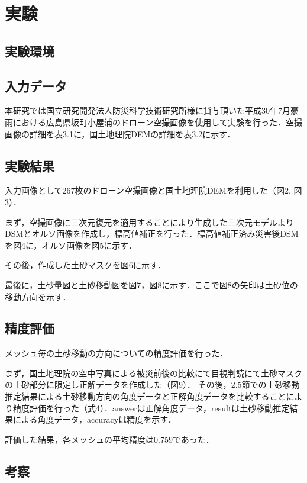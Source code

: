 \chapter{実験}
  \section{実験環境}

  \section{入力データ}
    本研究では国立研究開発法人防災科学技術研究所様に貸与頂いた平成30年7月豪雨における広島県坂町小屋浦のドローン空撮画像\cite{使用データ2}を使用して実験を行った．空撮画像の詳細を表3.1に，国土地理院DEMの詳細を表3.2に示す．

  \section{実験結果}
    入力画像として267枚のドローン空撮画像と国土地理院DEMを利用した（図2, 図3）．
  
    まず，空撮画像に三次元復元を適用することにより生成した三次元モデルよりDSMとオルソ画像を作成し，標高値補正を行った．標高値補正済み災害後DSMを図4に，オルソ画像を図5に示す．
  
    その後，作成した土砂マスクを図6に示す．
  
    最後に，土砂量図と土砂移動図を図7，図8に示す．ここで図8の矢印は土砂位の移動方向を示す．
  
  
  \section{精度評価}
    メッシュ毎の土砂移動の方向についての精度評価を行った．

    まず，国土地理院の空中写真による被災前後の比較\cite{使用データ3}にて目視判読にて土砂マスクの土砂部分に限定し正解データを作成した（図9）． その後，2.5節での土砂移動推定結果による土砂移動方向の角度データと正解角度データを比較することにより精度評価を行った（式4）．answerは正解角度データ，resultは土砂移動推定結果による角度データ，accuracyは精度を示す．


    評価した結果，各メッシュの平均精度は0.759であった．


  \section{考察}
